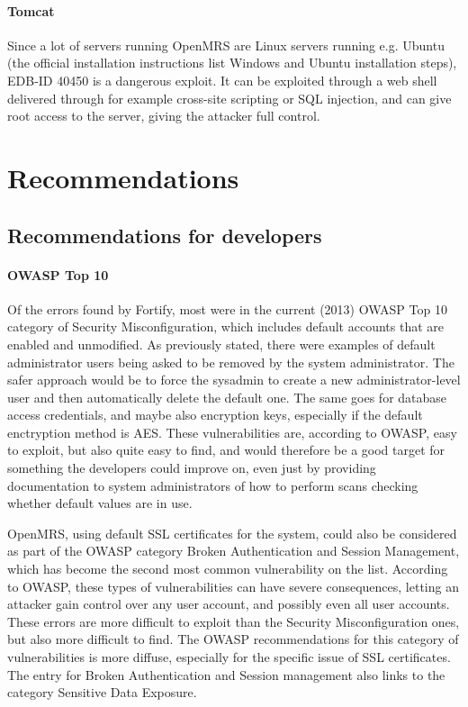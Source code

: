 \documentclass{report} %
\begin{document}
\paragraph{Tomcat}
Since a lot of servers running OpenMRS are Linux servers running e.g. Ubuntu
(the official installation instructions list Windows and Ubuntu installation
steps), EDB-ID 40450 is a dangerous exploit. It can be exploited through a web
shell delivered through for example cross-site scripting or SQL injection, and
can give root access to the server, giving the attacker full control.

\section{Recommendations}

\subsection{Recommendations for developers}

\paragraph{OWASP Top 10}
Of the errors found by Fortify, most were in the current (2013) OWASP Top 10
category of Security Misconfiguration, which includes default accounts that are
enabled and unmodified. As previously stated, there were examples of default
administrator users being asked to be removed by the system administrator. The
safer approach would be to force the sysadmin to create a new
administrator-level user and then automatically delete the default one. The same
goes for database access credentials, and maybe also encryption keys, especially
if the default enctryption method is AES. These vulnerabilities are, according to OWASP,
easy to exploit, but also quite easy to find, and would therefore be a good
target for something the developers could improve on, even just by providing
documentation to system administrators of how to perform scans checking whether
default values are in use.

OpenMRS, using default SSL certificates for the system, could also be considered
as part of the OWASP category Broken Authentication and Session Management,
which has become the second most common vulnerability on the list. According to
OWASP, these types of vulnerabilities can have severe consequences, letting an
attacker gain control over any user account, and possibly even all user accounts.
These errors are more difficult to exploit than the Security Misconfiguration
ones, but also more difficult to find. The OWASP recommendations for this
category of vulnerabilities is more diffuse, especially for the specific issue
of SSL certificates. The entry for Broken Authentication and Session management
also links to the category Sensitive Data Exposure.
\end{document}

